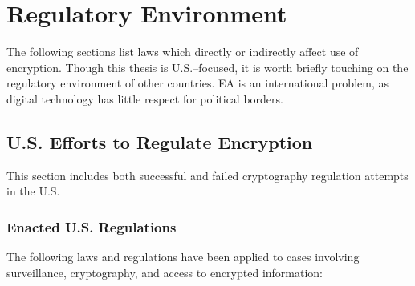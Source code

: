 

\section{Regulatory Environment}
\label{sec-reg-environment}

The following sections list laws which directly or indirectly affect use of encryption. Though this thesis is
U.S.--focused, it is worth briefly touching on the regulatory environment of other countries. \Ac{EA} is an international
problem, as digital technology has little respect for political borders.


\subsection{U.S. Efforts to Regulate Encryption}

This section includes both successful and failed cryptography regulation attempts in the U.S.

\subsubsection{Enacted U.S. Regulations}

The following laws and regulations have been applied to cases involving surveillance, cryptography, and access to
encrypted information:

\newcommand{\lawsstart}{\begin{itemize}}
\newcommand{\law}[4]{ %
    \item #1: \textbf{#2} \cite{#3} \nopagebreak

    \vspace{0.5\baselineskip} \parbox{\linewidth}{#4} \vspace{0.5\baselineskip}
}
\newcommand{\lawsend}{\end{itemize}}

